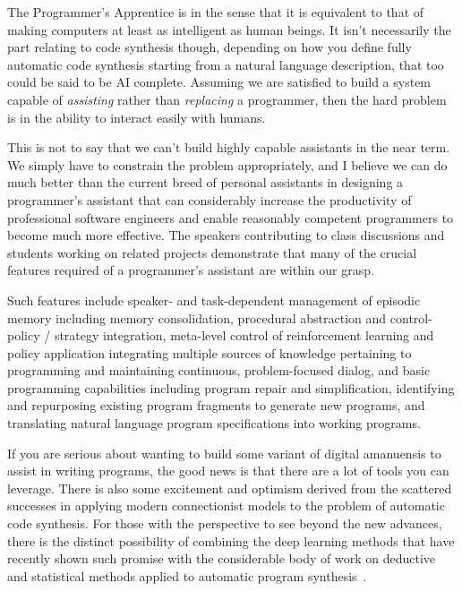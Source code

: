 
The Programmer's Apprentice is {} in the sense that it is equivalent to that of making computers at least as intelligent as human beings. It isn't necessarily the part relating to code synthesis \emdash{} though, depending on how you define fully automatic code synthesis starting from a natural language description, that too could be said to be AI complete. Assuming we are satisfied to build a system capable of {\it{assisting}} rather than {\it{replacing}} a programmer, then the hard problem is in the ability to interact easily with humans.

This is not to say that we can't build highly capable assistants in the near term. We simply have to constrain the problem appropriately, and I believe we can do much better than the current breed of personal assistants in designing a programmer's assistant that can considerably increase the productivity of professional software engineers and enable reasonably competent programmers to become much more effective. The speakers contributing to class discussions and students working on related projects demonstrate that many of the crucial features required of a programmer's assistant are within our grasp.

Such features include speaker- and task-dependent management of episodic memory including memory consolidation, procedural abstraction and control-policy / strategy integration, meta-level control of reinforcement learning and policy application integrating multiple sources of knowledge pertaining to programming and maintaining continuous, problem-focused dialog, and basic programming capabilities including program repair and simplification, identifying and repurposing existing program fragments to generate new programs, and translating natural language program specifications into working programs.

If you are serious about wanting to build some variant of digital amanuensis to assist in writing programs, the good news is that there are a lot of tools you can leverage. There is also some excitement and optimism derived from the scattered successes in applying modern connectionist models to the problem of automatic code synthesis. For those with the perspective to see beyond the new advances, there is the distinct possibility of combining the deep learning methods that have recently shown such promise with the considerable body of work on deductive and statistical methods applied to automatic program synthesis~\cite{GulwanietalFaTiPL-17}. 

